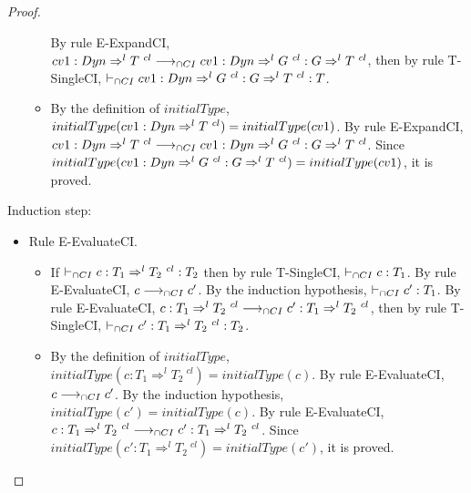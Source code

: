 \documentclass[a4paper]{article}
\begin{document}
\begin{proof}
\begin{itemize}
\begin{itemize}
        By rule E-ExpandCI, $cv1 : Dyn \Rightarrow^l T\ ^{cl} \longrightarrow_{\cap CI} cv1 : Dyn \Rightarrow^l G\ ^{cl} : G \Rightarrow^l T\ ^{cl}$, then by rule T-SingleCI, $\cits cv1 : \Dyn \Rightarrow^l G\ ^{cl} : G \Rightarrow^l T\ ^{cl} : T$.
        \item By the definition of $initialType$, $initialType(cv1 : \Dyn \Rightarrow^l T\ ^{cl}) = initialType(cv1)$.
        By rule E-ExpandCI, $cv1 : Dyn \Rightarrow^l T\ ^{cl} \longrightarrow_{\cap CI} cv1 : Dyn \Rightarrow^l G\ ^{cl} : G \Rightarrow^l T\ ^{cl}$.
        Since $initialType(cv1 : Dyn \Rightarrow^l G\ ^{cl} : G \Rightarrow^l T\ ^{cl}) = initialType(cv1)$, it is proved.
    \end{itemize}
\end{itemize}
Induction step:
\begin{itemize}
    \item Rule E-EvaluateCI.
    \begin{itemize}
        \item If $\cits c : T_1 \Rightarrow^l T_2\ ^{cl} : T_2$ then by rule T-SingleCI, $\vdash_{\cap CI} c : T_1$.
        By rule E-EvaluateCI, $c \longrightarrow_{\cap CI} c'$.
        By the induction hypothesis, $\vdash_{\cap CI} c' : T_1$.
        By rule E-EvaluateCI, $c : T_1 \Rightarrow^l T_2\ ^{cl} \longrightarrow_{\cap CI} c' : T_1 \Rightarrow^l T_2\ ^{cl}$, then by rule T-SingleCI, $\vdash_{\cap CI} c' : T_1 \Rightarrow^l T_2\ ^{cl} : T_2$.
        \item By the definition of $initialType$, $initialType(c : T_1 \Rightarrow^l T_2\ ^{cl}) = initialType(c)$.
        By rule E-EvaluateCI, $c \longrightarrow_{\cap CI} c'$.
        By the induction hypothesis, $initialType(c') = initialType(c)$.
        By rule E-EvaluateCI, $c : T_1 \Rightarrow^l T_2\ ^{cl} \longrightarrow_{\cap CI} c' : T_1 \Rightarrow^l T_2\ ^{cl}$.
        Since $initialType(c' : T_1 \Rightarrow^l T_2\ ^{cl}) = initialType(c')$, it is proved.
    \end{itemize}
\end{itemize}
\end{proof}
\end{document}
